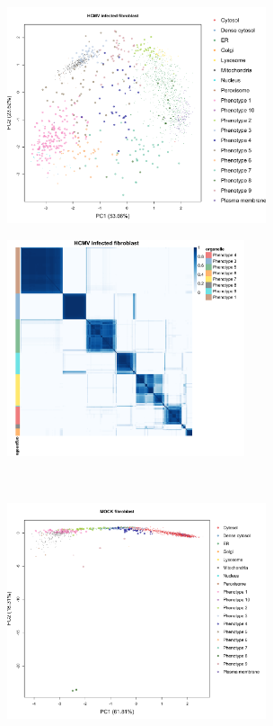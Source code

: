 \documentclass[12pt,english]{article}
\begin{document}
\begin{figure}
	\begin{subfigure}[t]{0.5\textwidth}
		\centering
		\includegraphics[height=2.5in]{pcaBeltranH.pdf}
		\caption{}
	\end{subfigure}	
	\begin{subfigure}[t]{0.5\textwidth}
		\centering
		\includegraphics[height=2.5in]{heatmapHCMV.pdf}
		\caption{}
	\end{subfigure}
	~
	\begin{subfigure}[t]{0.5\textwidth}
		\centering
		\includegraphics[height=2.5in]{pcaMOCK.pdf}
		\caption{}
	\end{subfigure}
	\begin{subfigure}[t]{0.5\textwidth}

\end{subfigure}
\end{figure}
\end{document}
